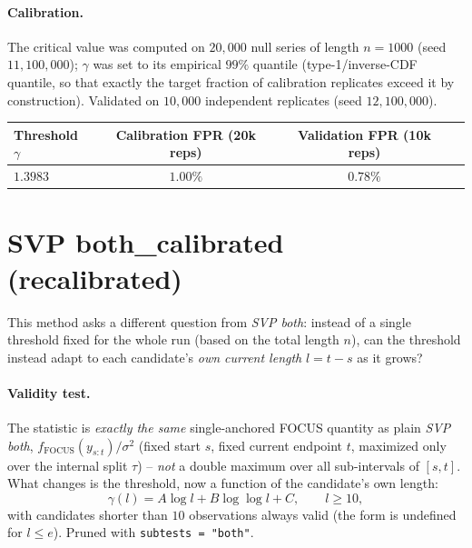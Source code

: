 \documentclass[11pt]{article}
\newcommand{\gam}{\gamma}
\begin{document}
\paragraph{Calibration.} The critical value was computed on $20{,}000$
null series of length $n=1000$ (seed $11{,}100{,}000$); $\gam$ was set to
its empirical $99\%$ quantile (type-1/inverse-CDF quantile, so that exactly
the target fraction of calibration replicates exceed it by construction).
Validated on $10{,}000$ independent replicates (seed $12{,}100{,}000$).

\begin{center}
\begin{tabular}{lccc}
\toprule
Threshold $\gam$ & Calibration FPR (20k reps) & Validation FPR (10k reps) \\
\midrule
$1.3983$ & $1.00\%$ & $0.78\%$ \\
\bottomrule
\end{tabular}
\end{center}

\section{SVP both\_calibrated (recalibrated)}

This method asks a different question from \emph{SVP both}: instead of a
single threshold fixed for the whole run (based on the total length $n$),
can the threshold instead adapt to each candidate's \emph{own current
length} $l = t-s$ as it grows?

\paragraph{Validity test.} The statistic is \emph{exactly the same}
single-anchored FOCUS quantity as plain \emph{SVP both},
$f_{\mathrm{FOCUS}}(y_{s:t})/\sigma^2$ (fixed start $s$, fixed current
endpoint $t$, maximized only over the internal split $\tau$) -- \emph{not}
a double maximum over all sub-intervals of $[s,t]$. What changes is the
threshold, now a function of the candidate's own length:
\[
\gam(l) = A\log l + B\log\log l + C, \qquad l \ge 10,
\]
with candidates shorter than $10$ observations always valid (the form is
undefined for $l \le e$). Pruned with \texttt{subtests = "both"}.
\end{document}
